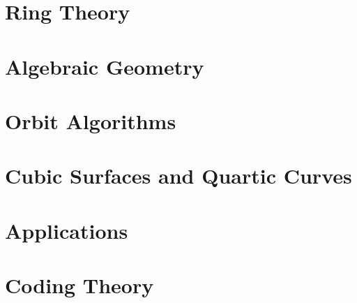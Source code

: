 \documentclass[10pt]{book}
\begin{document}
\chapter{Ring Theory}
\label{chapter:ring:theory}





\chapter{Algebraic Geometry}
\label{chapter:algebraic:geometry}





\chapter{Orbit Algorithms}
\label{chapter:orbit:algorithms}




\chapter{Cubic Surfaces and Quartic Curves}
\label{chapter:cubic:surfaces}





\chapter{Applications}
\label{chapter:applications}




\chapter{Coding Theory}
\label{chapter:coding:theory}




\end{document}
